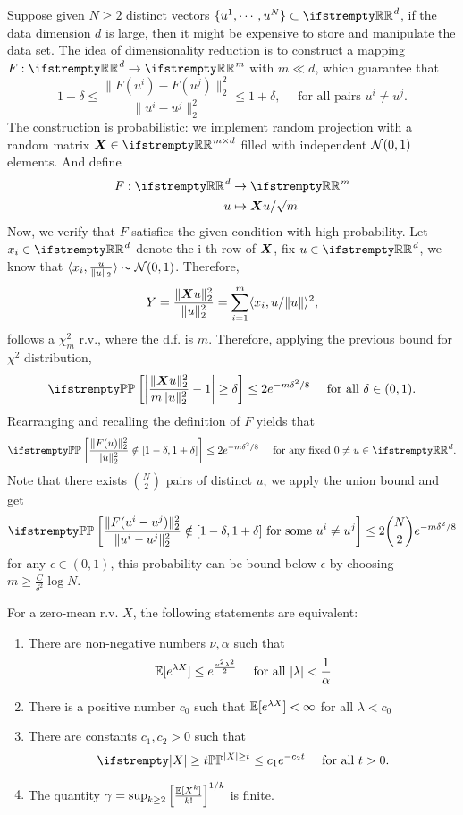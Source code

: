 \documentclass{paper}
\begin{document}
\begin{exmp}
	Suppose given $N\geq 2$ distinct vectors $\{u^1, \cdots, u^N\}\subset\RR^d$, if the data dimension $d$ is large, then it might be expensive to store and manipulate the data set.
	The idea of dimensionality reduction is to construct a mapping $F:\RR^d\to\RR^m$ with $m\ll d$, which guarantee that
	\[
		1-\delta \leq \frac{\lVert F(u^i)-F(u^j)\rVert_2^2}{\lVert u^i-u^j\rVert_2^2} \leq 1+\delta, \quad \text{ for all pairs } u^i\neq u^j.
	\]
	The construction is probabilistic: we implement random projection with a random matrix $\bmX\in\RR^{m\times d}$ filled with independent $\mathcal{N}(0, 1)$ elements. And define
	\begin{align*}
		F: \RR^d & \to \RR^m               \\
		u        & \mapsto \bmX u/\sqrt{m}
	\end{align*}
	Now, we verify that $F$ satisfies the given condition with high probability. Let $x_i\in \RR^d$ denote the i-th row of $\boldsymbol{X}$, fix $u\in\RR^d$,
	we know that $\langle x_i, \frac{u}{\lVert u\rVert_2}\rangle \sim \mathcal{N}(0, 1)$. Therefore,
	\[
		Y = \frac{\lVert \boldsymbol{X} u\rVert_2^2}{\lVert u\rVert_2^2} = \sum_{i=1}^{m}\langle x_i, u/\lVert u\rVert\rangle^2,
	\]
	follows a $\chi_m^2$ r.v., where the d.f. is $m$. Therefore, applying the previous bound for $\chi^2$ distribution,
	\[
		\PP\left[\left\vert\frac{\lVert\bmX u\rVert_2^2}{m\lVert u\rVert_2^2} - 1\right\vert\geq \delta\right] \leq 2e^{-m\delta^2/8} \quad \text{ for all } \delta \in (0, 1).
	\]
	Rearranging and recalling the definition of $F$ yields that
	\[
		\PP\left[\frac{\lVert F(u)\rVert_2^2}{\lvert u\rVert_2^2}\notin[1-\delta, 1+\delta]\right]\leq 2e^{-m\delta^2/8} \quad \text{ for any fixed } 0\neq u\in\RR^d.
	\]
	Note that there exists $\binom{N}{2}$ pairs of distinct $u$, we apply the union bound and get
	\[
		\PP\left[\frac{\lVert F(u^i-u^j)\rVert_2^2}{\lVert u^i-u^j\rVert_2^2}\notin[1-\delta, 1+\delta]\text{ for some } u^i\neq u^j\right]\leq 2\binom{N}{2}e^{-m\delta^2/8}
	\]
	for any $\epsilon\in(0, 1)$, this probability can be bound below $\epsilon$ by choosing $m\geq \frac{C}{\delta^2}\log N$.
\end{exmp}
\begin{thm}
	For a zero-mean r.v. $X$, the following statements are equivalent:
	\begin{enumerate}
		\item There are non-negative numbers $\nu, \alpha$ such that
		      \[
			      \mathbb{E}[e^{\lambda X}]\leq e^{\frac{\nu^2\lambda^2}{2}}\quad \text{ for all } \vert \lambda\vert < \frac{1}{\alpha}
		      \]
		\item There is a positive number $c_0$ such that $\mathbb{E}[e^{\lambda X}]<\infty$ for all $\lambda<c_0$
		\item There are constants $c_1, c_2>0$ such that
		      \[
			      \PP[\vert X\vert\geq t] \leq c_1e^{-c_2t} \quad \text{ for all } t>0.
		      \]
		\item The quantity $\gamma=\sup_{k\geq 2}\left[\frac{\mathbb{E}[X^k]}{k!}\right]^{1/k}$ is finite.
	\end{enumerate}
\end{thm}
\end{document}
